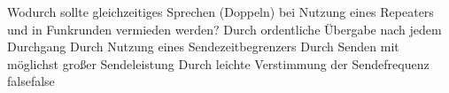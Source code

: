     {Wodurch sollte gleichzeitiges Sprechen (Doppeln) bei Nutzung eines Repeaters und in Funkrunden vermieden werden?}
    {Durch ordentliche Übergabe nach jedem Durchgang}
    {Durch Nutzung eines Sendezeitbegrenzers}
    {Durch Senden mit möglichst großer Sendeleistung}
    {Durch leichte Verstimmung der Sendefrequenz}
    {false}{false}